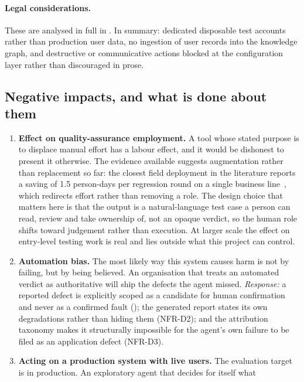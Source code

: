 \paragraph{Legal considerations.} These are analysed in full in
. In summary: dedicated disposable test accounts rather
than production user data, no ingestion of user records into the knowledge
graph, and destructive or communicative actions blocked at the configuration
layer rather than discouraged in prose.

\subsection*{Negative impacts, and what is done about them}

\begin{enumerate}[label=\textbf{N\arabic*.},leftmargin=3.0em]
  \item \textbf{Effect on quality-assurance employment.} A tool whose stated
    purpose is to displace manual effort has a labour effect, and it would be
    dishonest to present it otherwise. The evidence available suggests
    augmentation rather than replacement so far: the closest field deployment in
    the literature reports a saving of 1.5 person-days per regression round on a
    single business line~\cite{auitestagent}, which redirects effort rather than
    removing a role. The design choice that matters here is that the output is a
    natural-language test case a person can read, review and take ownership of,
    not an opaque verdict, so the human role shifts toward judgement rather than
    execution. At larger scale the effect on entry-level testing work is real
    and lies outside what this project can control.
  \item \textbf{Automation bias.} The most likely way this system causes harm is
    not by failing, but by being believed. An organisation that treats an
    automated verdict as authoritative will ship the defects the agent missed.
    \emph{Response:} a reported defect is explicitly scoped as a candidate for
    human confirmation and never as a confirmed fault ();
    the generated report states its own degradations rather than hiding them
    (NFR-D2); and the attribution taxonomy makes it structurally impossible for
    the agent's own failure to be filed as an application defect (NFR-D3).
  \item \textbf{Acting on a production system with live users.} The evaluation
    target is in production. An exploratory agent that decides for itself what

\end{enumerate}
